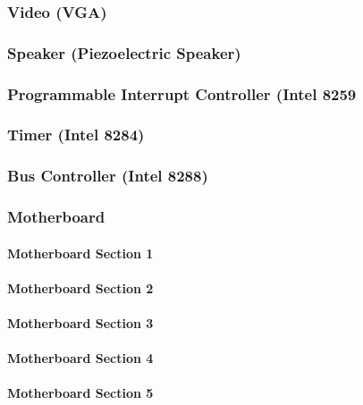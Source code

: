 \documentclass[12pt, letterpaper]{article}
\begin{document}
\subsubsection{Video (VGA)}

\subsubsection{Speaker (Piezoelectric Speaker)}

\subsubsection{Programmable Interrupt Controller (Intel 8259}

\subsubsection{Timer (Intel 8284)}

\subsubsection{Bus Controller (Intel 8288)}

\subsubsection{Motherboard}

\paragraph{Motherboard Section 1}

\paragraph{Motherboard Section 2}

\paragraph{Motherboard Section 3}

\paragraph{Motherboard Section 4}

\paragraph{Motherboard Section 5}
\end{document}
